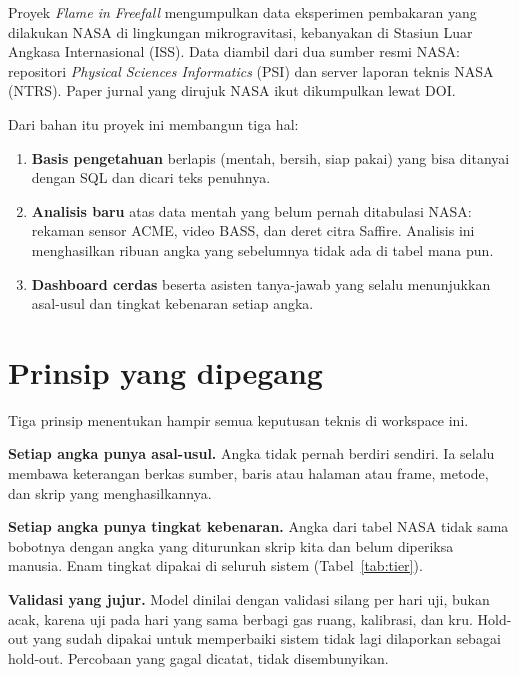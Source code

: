 \documentclass[11pt,a4paper]{report}
\newcommand{\asing}[1]{\textit{#1}}             %
\begin{document}
Proyek \emph{Flame in Freefall} mengumpulkan data eksperimen pembakaran yang dilakukan NASA di
lingkungan mikrogravitasi, kebanyakan di Stasiun Luar Angkasa Internasional (ISS). Data diambil
dari dua sumber resmi NASA: repositori \asing{Physical Sciences Informatics} (PSI) dan server
laporan teknis NASA (NTRS). Paper jurnal yang dirujuk NASA ikut dikumpulkan lewat DOI.

Dari bahan itu proyek ini membangun tiga hal:
\begin{enumerate}
  \item \textbf{Basis pengetahuan} berlapis (mentah, bersih, siap pakai) yang bisa ditanyai
        dengan SQL dan dicari teks penuhnya.
  \item \textbf{Analisis baru} atas data mentah yang belum pernah ditabulasi NASA: rekaman sensor
        ACME, video BASS, dan deret citra Saffire. Analisis ini menghasilkan ribuan angka yang
        sebelumnya tidak ada di tabel mana pun.
  \item \textbf{Dashboard cerdas} beserta asisten tanya-jawab yang selalu menunjukkan asal-usul
        dan tingkat kebenaran setiap angka.
\end{enumerate}

\section{Prinsip yang dipegang}

Tiga prinsip menentukan hampir semua keputusan teknis di workspace ini.

\textbf{Setiap angka punya asal-usul.} Angka tidak pernah berdiri sendiri. Ia selalu membawa
keterangan berkas sumber, baris atau halaman atau frame, metode, dan skrip yang menghasilkannya.

\textbf{Setiap angka punya tingkat kebenaran.} Angka dari tabel NASA tidak sama bobotnya dengan
angka yang diturunkan skrip kita dan belum diperiksa manusia. Enam tingkat dipakai di seluruh
sistem (Tabel~\ref{tab:tier}).

\textbf{Validasi yang jujur.} Model dinilai dengan validasi silang per hari uji, bukan acak,
karena uji pada hari yang sama berbagi gas ruang, kalibrasi, dan kru. Hold-out yang sudah
dipakai untuk memperbaiki sistem tidak lagi dilaporkan sebagai hold-out. Percobaan yang gagal
dicatat, tidak disembunyikan.
\end{document}
